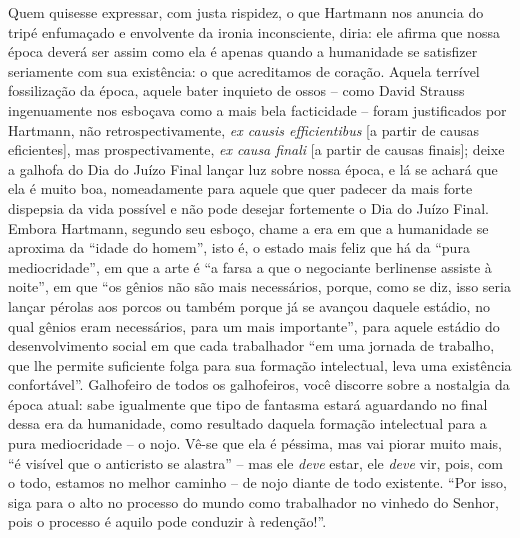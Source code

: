 \begin{enumerate}
\begin{enumerate}
    Quem quisesse expressar, com justa rispidez, o que Hartmann nos
    anuncia do tripé enfumaçado e envolvente da ironia inconsciente,
    diria: ele afirma que nossa época deverá ser assim como ela é apenas
    quando a humanidade se satisfizer seriamente com sua existência: o
    que acreditamos de coração. Aquela terrível fossilização da época,
    aquele bater inquieto de ossos -- como David Strauss ingenuamente
    nos esboçava como a mais bela facticidade -- foram justificados por
    Hartmann, não retrospectivamente, \emph{ex causis efficientibus}
    {[}a partir de causas eficientes{]}, mas prospectivamente, \emph{ex
    causa finali} {[}a partir de causas finais{]}; deixe a galhofa do
    Dia do Juízo Final lançar luz sobre nossa época, e lá se achará que
    ela é muito boa, nomeadamente para aquele que quer padecer da mais
    forte dispepsia da vida possível e não pode desejar fortemente o Dia
    do Juízo Final. Embora Hartmann, segundo seu esboço, chame a era em
    que a humanidade se aproxima da ``idade do homem'', isto é, o estado
    mais feliz que há da ``pura mediocridade'', em que a arte é ``a
    farsa a que o negociante berlinense assiste à noite'', em que ``os
    gênios não são mais necessários, porque, como se diz, isso seria
    lançar pérolas aos porcos ou também porque já se avançou daquele
    estádio, no qual gênios eram necessários, para um mais importante'',
    para aquele estádio do desenvolvimento social em que cada
    trabalhador ``em uma jornada de trabalho, que lhe permite suficiente
    folga para sua formação intelectual, leva uma existência
    confortável''. Galhofeiro de todos os galhofeiros, você discorre
    sobre a nostalgia da época atual: sabe igualmente que tipo de
    fantasma estará aguardando no final dessa era da humanidade, como
    resultado daquela formação intelectual para a pura mediocridade -- o
    nojo. Vê-se que ela é péssima, mas vai piorar muito mais, ``é
    visível que o anticristo se alastra'' -- mas ele \emph{deve} estar,
    ele \emph{deve} vir, pois, com o todo, estamos no melhor caminho --
    de nojo diante de todo existente. ``Por isso, siga para o alto no
    processo do mundo como trabalhador no vinhedo do Senhor, pois o
    processo é aquilo pode conduzir à redenção!''.


\end{enumerate}
\end{enumerate}

